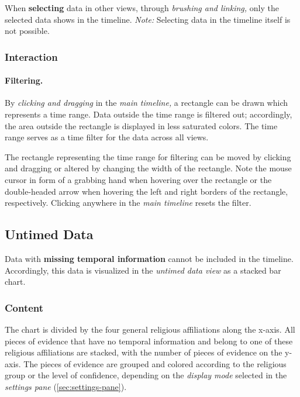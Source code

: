 When \textbf{selecting} data in other views, through \emph{brushing and linking,} only the selected data shows in the timeline.
\emph{Note:} Selecting data in the timeline itself is not possible.

\subsubsection{Interaction}

\paragraph{Filtering.}
\label{sec:timeline-filtering}
By \emph{clicking and dragging} in the \emph{main timeline,} a rectangle can be drawn which represents a time range.
Data outside the time range is filtered out;
accordingly, the area outside the rectangle is displayed in less saturated colors.
The time range serves as a time filter for the data across all views.

The rectangle representing the time range for filtering can be moved by clicking and dragging or altered by changing the width of the rectangle.
Note the mouse cursor in form of a grabbing hand when hovering over the rectangle or the double-headed arrow when hovering the left and right borders of the rectangle, respectively.
Clicking anywhere in the \emph{main timeline} resets the filter.


\subsection{Untimed Data}
\label{sec:untimed-data}

Data with \textbf{missing temporal information} cannot be included in the timeline.
Accordingly, this data is visualized in the \emph{untimed data view} as a stacked bar chart.

\subsubsection{Content}

The chart is divided by the four general religious affiliations along the x-axis.
All pieces of evidence that have no temporal information and belong to one of these religious affiliations are stacked, with the number of pieces of evidence on the y-axis.
The pieces of evidence are grouped and colored according to the religious group or the level of confidence, depending on the \emph{display mode} selected in the \emph{settings pane} (\cref{sec:settings-pane}).

